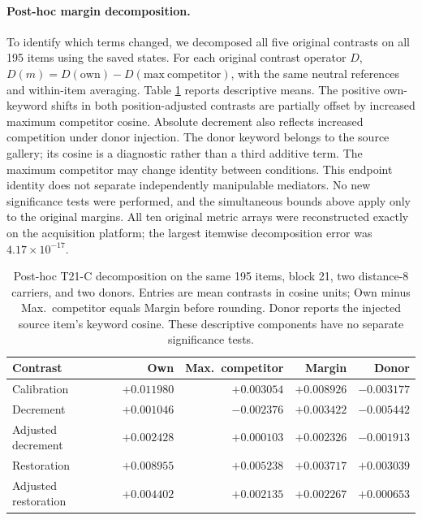 \documentclass{article}
\begin{document}
\paragraph{Post-hoc margin decomposition.}
To identify which terms changed, we decomposed all five original contrasts on
all 195 items using the saved states. For each original contrast operator
$D$, $D(m)=D(\mathrm{own})-D(\mathrm{max\ competitor})$, with the same
neutral references and within-item averaging. Table \ref{tab:t21-decomposition}
reports descriptive means. The positive own-keyword shifts in both
position-adjusted contrasts are partially offset by increased maximum
competitor cosine. Absolute decrement also reflects increased competition
under donor injection. The donor keyword belongs to the source gallery;
its cosine is a diagnostic rather than a third additive term. The maximum
competitor may change identity between conditions. This endpoint identity
does not separate independently manipulable mediators. No new significance
tests were performed, and the simultaneous bounds above apply only to the
original margins. All ten original metric arrays were reconstructed exactly
on the acquisition platform; the largest itemwise decomposition error was
$4.17\times10^{-17}$.

\begin{table}[ht]
\centering
\small
\begin{tabular}{lrrrr}
\toprule
Contrast & Own & Max.\ competitor & Margin & Donor \\
\midrule
Calibration & $+0.011980$ & $+0.003054$ & $+0.008926$ & $-0.003177$ \\
Decrement & $+0.001046$ & $-0.002376$ & $+0.003422$ & $-0.005442$ \\
Adjusted decrement & $+0.002428$ & $+0.000103$ & $+0.002326$ & $-0.001913$ \\
Restoration & $+0.008955$ & $+0.005238$ & $+0.003717$ & $+0.003039$ \\
Adjusted restoration & $+0.004402$ & $+0.002135$ & $+0.002267$ & $+0.000653$ \\
\bottomrule
\end{tabular}
\caption{Post-hoc T21-C decomposition on the same 195 items, block 21, two
distance-8 carriers, and two donors. Entries are mean contrasts in cosine
units; Own minus Max.\ competitor equals Margin before rounding. Donor
reports the injected source item's keyword cosine. These descriptive
components have no separate significance tests.}
\label{tab:t21-decomposition}
\end{table}
\end{document}
